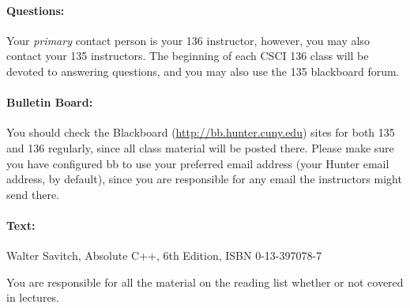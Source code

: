 \documentclass[10pt]{article}
\begin{document}
\paragraph*{\bf Questions:} %
  Your \emph{primary} contact person is your 136 instructor, however, you may also contact your 135 instructors.
  The beginning of each CSCI 136 class will be devoted to answering
  questions, and you may also use the 135 blackboard forum. 

\paragraph*{\bf Bulletin Board:}
  You should check the Blackboard (\url{http://bb.hunter.cuny.edu})
  sites for both 135 and 136 regularly, since all class material will
  be posted there.
  Please make sure you have configured bb to use your preferred email
  address (your Hunter email address, by default), since you are
  responsible for any email the instructors might send there. 

\paragraph*{\bf Text:}
  Walter Savitch, Absolute C++, 6th Edition, ISBN 0-13-397078-7

  You are responsible for all the material on the reading list whether
  or not covered in lectures.  
\end{document}
